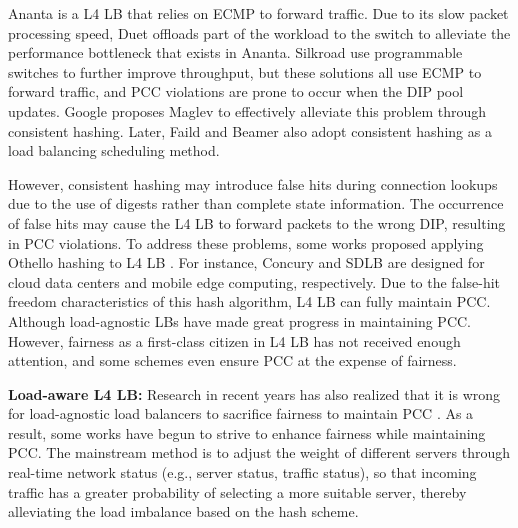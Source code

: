 Ananta \cite{patel2013ananta} is a L4 LB that relies on ECMP to forward traffic. Due to its slow packet processing speed, Duet \cite{gandhi2014duet} offloads part of the workload to the switch to alleviate the performance bottleneck that exists in Ananta. Silkroad \cite{miao2017silkroad} use programmable switches to further improve throughput, but these solutions all use ECMP to forward traffic, and PCC violations are prone to occur when the DIP pool updates. Google proposes Maglev \cite{eisenbud2016maglev} to effectively alleviate this problem through consistent hashing. Later, Faild \cite{araujo2018balancing} and Beamer \cite{olteanu2018stateless} also adopt consistent hashing as a load balancing scheduling method.

However, consistent hashing may introduce false hits during connection lookups due to the use of digests rather than complete state information. The occurrence of false hits may cause the L4 LB to forward packets to the wrong DIP, resulting in PCC violations. To address these problems, some works proposed applying Othello hashing to L4 LB \cite{yu2018memory}. For instance, Concury \cite{shi2020concury} and SDLB \cite{yu2017sdlb} are designed for cloud data centers and mobile edge computing, respectively. Due to the false-hit freedom characteristics of this hash algorithm, L4 LB can fully maintain PCC. Although load-agnostic LBs have made great progress in maintaining PCC. However, fairness as a first-class citizen in L4 LB has not received enough attention, and some schemes even ensure PCC at the expense of fairness.

\textbf{Load-aware L4 LB:}
Research in recent years has also realized that it is wrong for load-agnostic load balancers to sacrifice fairness to maintain PCC \cite{zhang2020fast, barbette2021cheetah, yao2022hlb}. As a result, some works have begun to strive to enhance fairness while maintaining PCC. The mainstream method is to adjust the weight of different servers through real-time network status (e.g., server status, traffic status), so that incoming traffic has a greater probability of selecting a more suitable server, thereby alleviating the load imbalance based on the hash scheme.

